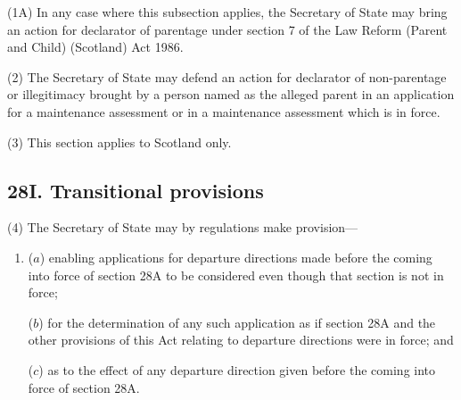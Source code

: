 \documentclass[12pt,a4paper]{article}
\begin{document}
(1A) In any case where this subsection applies, the Secretary of State may bring an action for declarator of parentage under section 7 of the Law Reform (Parent and Child) (Scotland) Act 1986.

(2) The Secretary of State may defend an action for declarator of non-parentage or illegitimacy brought by a person named as the alleged parent in an application for a maintenance assessment
or in a maintenance assessment which is in force.  %

(3) This section applies to Scotland only.


\subsection{28I. Transitional provisions}

%
%
%

(4) The Secretary of State may by regulations make provision—
\begin{enumerate}\item[]
($a$) enabling applications for departure directions made before the coming into force of section 28A to be considered even though that section is not in force;

($b$) for the determination of any such application as if section 28A and the other provisions of this Act relating to departure directions were in force; and

($c$) as to the effect of any departure direction given before the coming into force of section 28A.
\end{enumerate}
\end{document}
